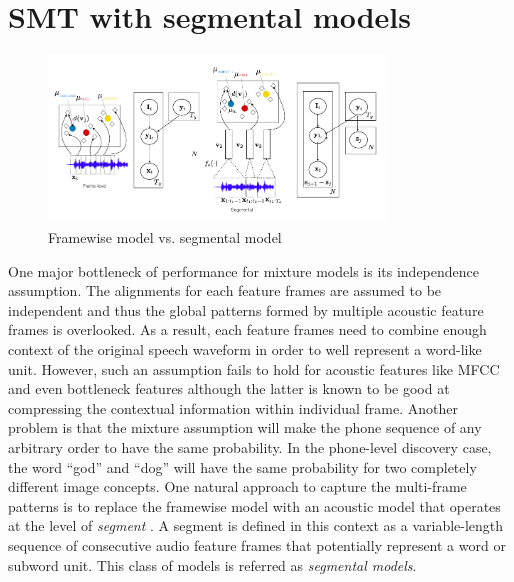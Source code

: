 \documentclass[journal]{IEEEtran}
\begin{document}
\section{SMT with segmental models}
\begin{figure}[t]
    \centering
    \includegraphics[width=0.8\textwidth]{fig_2.png}
    \caption{Framewise model vs. segmental model}
    \label{fig:frame-segmental-comparison}
\end{figure}
One major bottleneck of performance for mixture models is its independence assumption. The alignments for each feature frames are assumed to be independent and thus the global patterns formed by multiple acoustic feature frames is overlooked. As a result, each feature frames need to  combine enough context of the original speech waveform in order to well represent a word-like unit. However, such an assumption fails to hold for acoustic features like MFCC and even bottleneck features although the latter is known to be good at compressing the contextual information within individual frame. Another problem is that the mixture assumption will make the phone sequence of any arbitrary order to have the same probability. In the phone-level discovery case, the word ``god'' and ``dog'' will have the same probability for two completely different image concepts. One natural approach to capture the multi-frame patterns is to replace the framewise model with an acoustic model that operates at the level of \textit{segment} \cite{Kamper2017}. A segment is defined in this context as a variable-length sequence of consecutive audio feature frames that potentially represent a word or subword unit. This class of models is referred as \textit{segmental models}.   
\end{document}
